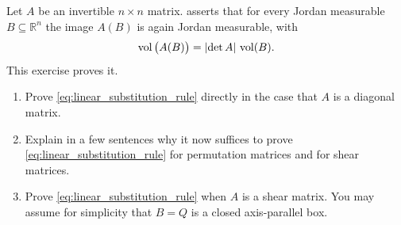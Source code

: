 \begin{exercise}
\label{ex:linear_substitution_elementary_matrices}
Let $A$ be an invertible $n\times n$ matrix. 
asserts that for every Jordan measurable $B \subseteq \mathbb{R}^n$ the image $A(B)$ is again
Jordan measurable, with
\begin{equation}
\label{eq:linear_substitution_rule}
\operatorname{vol}\big(A(B)\big) = \lvert\det A\rvert \, \operatorname{vol}(B).
\end{equation}
This exercise proves it.
\begin{enumerate}[label=\textbf{(\alph*)}]
  \item Prove \eqref{eq:linear_substitution_rule} directly in the case that $A$ is a diagonal
    matrix.
  \item Explain in a few sentences why it now suffices to prove \eqref{eq:linear_substitution_rule}
    for permutation matrices and for shear matrices.
  \item Prove \eqref{eq:linear_substitution_rule} when $A$ is a shear matrix. You may assume for
    simplicity that $B = Q$ is a closed axis-parallel box.
\end{enumerate}
\end{exercise}

